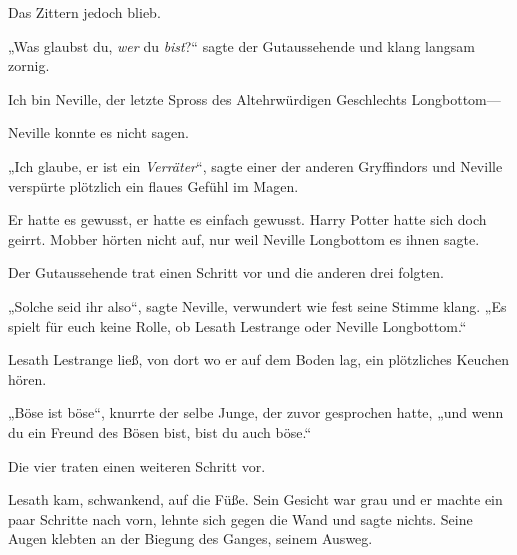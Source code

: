 Das Zittern jedoch blieb.

„Was glaubst du, \emph{wer} du \emph{bist}?“ sagte der Gutaussehende und klang langsam zornig.

Ich bin Neville, der letzte Spross des Altehrwürdigen Geschlechts Longbottom—

Neville konnte es nicht sagen.

„Ich glaube, er ist ein \emph{Verräter}“, sagte einer der anderen Gryffindors und Neville verspürte plötzlich ein flaues Gefühl im Magen.

Er hatte es gewusst, er hatte es einfach gewusst. Harry Potter hatte sich doch geirrt. Mobber hörten nicht auf, nur weil Neville Longbottom es ihnen sagte.

Der Gutaussehende trat einen Schritt vor und die anderen drei folgten.

„Solche seid ihr also“, sagte Neville, verwundert wie fest seine Stimme klang. „Es spielt für euch keine Rolle, ob Lesath Lestrange oder Neville Longbottom.“

Lesath Lestrange ließ, von dort wo er auf dem Boden lag, ein plötzliches Keuchen hören.

„Böse ist böse“, knurrte der selbe Junge, der zuvor gesprochen hatte, „und wenn du ein Freund des Bösen bist, bist du auch böse.“

Die vier traten einen weiteren Schritt vor.

Lesath kam, schwankend, auf die Füße. Sein Gesicht war grau und er machte ein paar Schritte nach vorn, lehnte sich gegen die Wand und sagte nichts. Seine Augen klebten an der Biegung des Ganges, seinem Ausweg.

